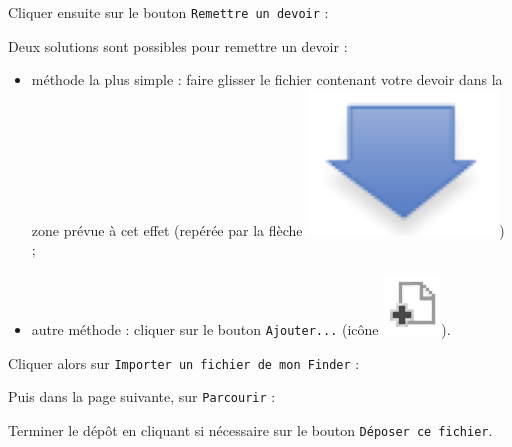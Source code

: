 
Cliquer ensuite sur le bouton \texttt{Remettre un devoir} :


Deux solutions sont possibles pour remettre un devoir :
\begin{itemize}
\item méthode la plus simple : faire glisser le fichier contenant votre devoir dans la zone prévue à cet effet (repérée par la flèche \includegraphics[width=.04\textwidth]{./images/methode/MoodleDevoirIcone2}) ;
\item autre méthode : cliquer sur le bouton \texttt{Ajouter...} (icône \includegraphics[width=.04\textwidth]{./images/methode/MoodleDevoirIcone3}).
\end{itemize}


Cliquer alors sur \texttt{Importer un fichier de mon Finder} :


Puis dans la page suivante, sur \texttt{Parcourir} :



Terminer le dépôt en cliquant si nécessaire sur le bouton \texttt{Déposer ce fichier}.












 

